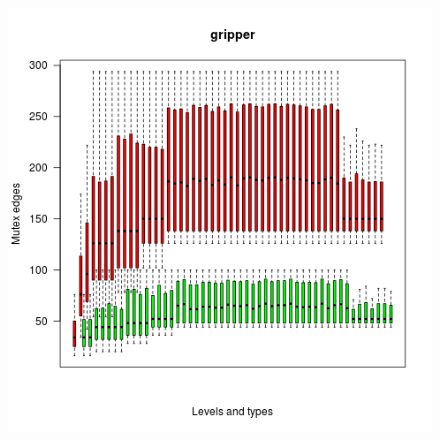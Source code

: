 \documentclass[handout,t]{beamer}
\begin{document}
\begin{frame}
  \begin{figure}[ht!]
    \centering
    \includegraphics[width=0.65\linewidth]{dist_exlusive_gripper}
    \label{fig::figura12} 
  \end{figure}        
\end{frame}
%  
%  

\end{document}
